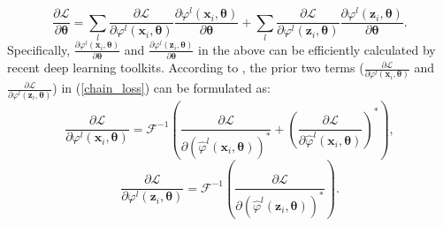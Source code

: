 \documentclass[runningheads]{llncs}
\begin{document}
\begin{equation}\label{chain_loss}
   {\frac{\partial \mathcal{L}}{\partial \mathbf{\theta}} = \sum_{l}\frac{\partial \mathcal{L}}{\partial \varphi^{l}(\mathbf{x}_{i}, \mathbf{\theta})}\frac{\partial \varphi^{l}(\mathbf{x}_{i}, \mathbf{\theta})}{\partial \mathbf{\theta}} + \sum_{l}\frac{\partial \mathcal{L}}{\partial \varphi^{l}(\mathbf{z}_{i}, \mathbf{\theta})}\frac{\partial \varphi^{l}(\mathbf{z}_{i}, \mathbf{\theta})}{\partial \mathbf{\theta}}}.
\end{equation}
Specifically, $\frac{\partial \varphi^{l}(\mathbf{x}_{i}, \mathbf{\theta})}{\partial \mathbf{\theta}}$ and $\frac{\partial \varphi^{l}(\mathbf{z}_{i}, \mathbf{\theta})}{\partial \mathbf{\theta}}$ in the above can be efficiently calculated by recent deep learning toolkits.
According to \cite{CFNet,DCFNet}, the prior two terms ($\frac{\partial \mathcal{L}}{\partial \varphi^{l}(\mathbf{x}_{i}, \mathbf{\theta})}$ and $\frac{\partial \mathcal{L}}{\partial \varphi^{l}(\mathbf{z}_{i}, \mathbf{\theta})}$) in (\ref{chain_loss}) can be formulated as:
\begin{equation}\label{loss_solve_}
  \frac{\partial \mathcal{L}}{\partial \varphi^{l}(\mathbf{x}_{i}, \mathbf{\theta})} = \mathcal{F}^{-1}(\frac{\partial \mathcal{L}}{\partial (\hat{\varphi}^{l}(\mathbf{x}_{i}, \mathbf{\theta}))^{\ast}}+ (\frac{\partial \mathcal{L}}{\partial \hat{\varphi}^{l}(\mathbf{x}_{i}, \mathbf{\theta})})^{\ast}),
\end{equation}
\begin{equation}\label{loss_solve}
  \frac{\partial \mathcal{L}}{\partial \varphi^{l}(\mathbf{z}_{i}, \mathbf{\theta})} = \mathcal{F}^{-1}(\frac{\partial \mathcal{L}}{\partial (\hat{\varphi}^{l}(\mathbf{z}_{i}, \mathbf{\theta}))^{\ast}}).
\end{equation}


\end{document}
